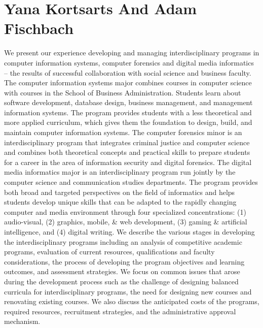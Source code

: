 \documentclass{article}
\begin{document}
\section{Yana Kortsarts And Adam Fischbach}
We present our experience developing and managing interdisciplinary programs in computer information systems, computer forensics and digital media informatics – the results of successful collaboration with social science and business faculty. The computer information systems major combines courses in computer science with courses in the School of Business Administration. Students learn about software development, database design, business management, and management information systems. The program provides students with a less theoretical and more applied curriculum, which gives them the foundation to design, build, and maintain computer information systems.  The computer forensics minor is an interdisciplinary program that integrates criminal justice and computer science and combines both theoretical concepts and practical skills to prepare students for a career in the area of information security and digital forensics. The digital media informatics major is an interdisciplinary program run jointly by the computer science and communication studies departments. The program provides both broad and targeted perspectives on the field of informatics and helps students develop unique skills that can be adapted to the rapidly changing computer and media environment through four specialized concentrations: (1) audio-visual, (2) graphics, mobile, \& web development, (3) gaming \& artificial intelligence, and (4) digital writing. We describe the various stages in developing the interdisciplinary programs including an analysis of competitive academic programs, evaluation of current resources, qualifications and faculty considerations, the process of developing the program objectives and learning outcomes, and assessment strategies. We focus on common issues that arose during the development process such as the challenge of designing balanced curricula for interdisciplinary programs, the need for designing new courses and renovating existing courses. We also discuss the anticipated costs of the programs, required resources, recruitment strategies, and the administrative approval mechanism.
\end{document}

